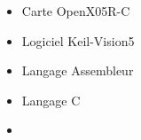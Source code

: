 \documentclass{article}
\begin{document}
\begin{tabular}
\begin{itemize}
\begin{itemize}
            \item \textcolor{gray!80}{Carte OpenX05R-C}
            \item \textcolor{gray!80}{Logiciel Keil-\textmu Vision5 }
            \item \textcolor{gray!80}{Langage Assembleur}
            \item \textcolor{gray!80}{Langage C}
            \item[\textcolor{white}{}] {} %
     
        \end{itemize}
    \end{itemize}
\end{tabular}



\begin{center}
\end{center}
\end{document}
